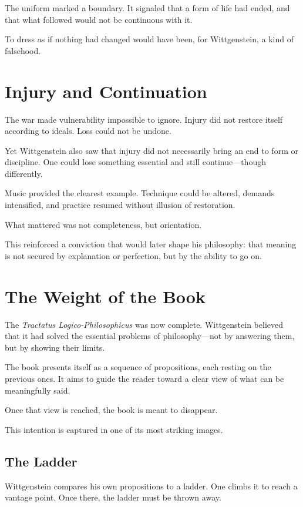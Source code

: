 \documentclass[11pt]{article}
\begin{document}
The uniform marked a boundary. It signaled that a form of life had ended, and that what followed would not be continuous with it.

To dress as if nothing had changed would have been, for Wittgenstein, a kind of falsehood.

\section*{Injury and Continuation}

The war made vulnerability impossible to ignore. Injury did not restore itself according to ideals. Loss could not be undone.

Yet Wittgenstein also saw that injury did not necessarily bring an end to form or discipline. One could lose something essential and still continue—though differently.

Music provided the clearest example. Technique could be altered, demands intensified, and practice resumed without illusion of restoration.

What mattered was not completeness, but orientation.

This reinforced a conviction that would later shape his philosophy: that meaning is not secured by explanation or perfection, but by the ability to go on.

\section*{The Weight of the Book}

The \emph{Tractatus Logico-Philosophicus} was now complete. Wittgenstein believed that it had solved the essential problems of philosophy—not by answering them, but by showing their limits.

The book presents itself as a sequence of propositions, each resting on the previous ones. It aims to guide the reader toward a clear view of what can be meaningfully said.

Once that view is reached, the book is meant to disappear.

This intention is captured in one of its most striking images.

\subsection*{The Ladder}

Wittgenstein compares his own propositions to a ladder. One climbs it to reach a vantage point. Once there, the ladder must be thrown away.
\end{document}
